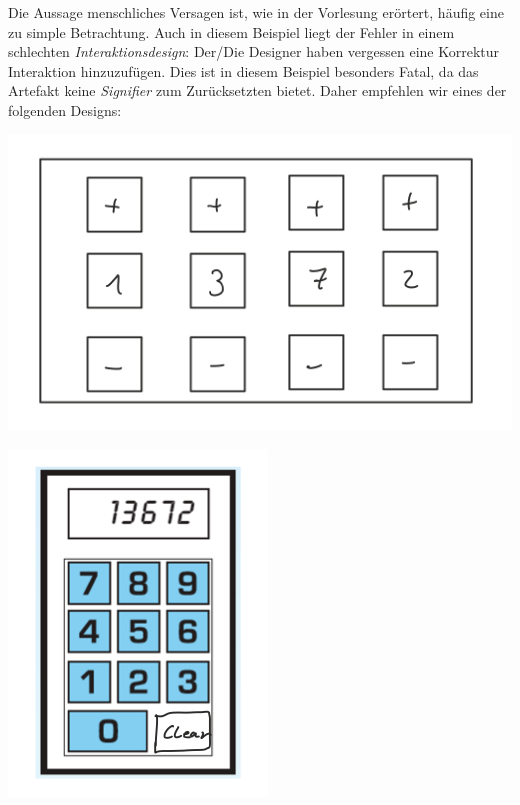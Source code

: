 \graphicspath{ {../images/} } 

Die Aussage menschliches Versagen ist, wie in der Vorlesung erörtert, häufig
eine zu simple Betrachtung. Auch in diesem Beispiel liegt der Fehler in einem
schlechten \textit{Interaktionsdesign}: Der/Die Designer haben vergessen eine
Korrektur Interaktion hinzuzufügen. Dies ist in diesem Beispiel besonders Fatal,
da das Artefakt keine \textit{Signifier} zum Zurücksetzten bietet. Daher
empfehlen wir eines der folgenden Designs:

\begin{minipage}{\linewidth}
  \centering
  \includegraphics{design1}
\end{minipage}

\begin{minipage}{\linewidth}
  \centering
  \includegraphics{design2}
\end{minipage}
